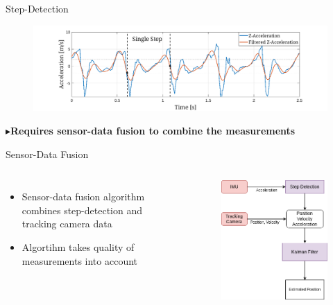 \documentclass[aspectratio=169]{beamer}
\begin{document}
{\begin{frame}{Step-Detection}
		\begin{figure}
			\centering
			\includegraphics[width=0.9\linewidth]{../Conference_Paper/WalkAcceleration}
		\end{figure}
		
		\pause
		\pause
		\pause
		\pause
		\begin{alert}{$\blacktriangleright$\textbf{Requires sensor-data fusion to combine the measurements}}
		\end{alert}
		
		
		
	\end{frame}

	
	\begin{frame}{Sensor-Data Fusion}
		\begin{columns}
				\vspace{-3.5cm}
				\begin{itemize}
				\item<2-> Sensor-data fusion algorithm combines step-detection and tracking camera data
				\item<3-> Algortihm takes quality of measurements into account
			\end{itemize}
			\begin{figure}
				\centering
				\includegraphics[height=0.8\textheight]{schema1.png}
			\end{figure}
		\end{columns}
	

\end{frame}}
\end{document}
